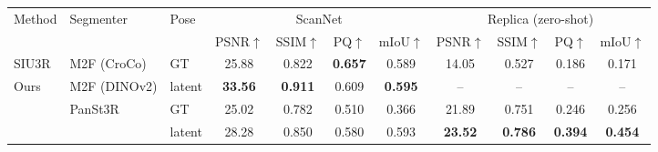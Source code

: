\documentclass[border=6pt]{standalone}
\begin{document}
\setlength{\tabcolsep}{5pt}
\small
\begin{tabular}{@{}lll cccc cccc@{}}
\toprule
\multirow{2}{*}{Method} & \multirow{2}{*}{Segmenter} & \multirow{2}{*}{Pose}
  & \multicolumn{4}{c}{ScanNet}
  & \multicolumn{4}{c}{Replica (zero-shot)} \\
\cmidrule(lr){4-7} \cmidrule(lr){8-11}
 & & & PSNR$\uparrow$ & SSIM$\uparrow$ & PQ$\uparrow$ & mIoU$\uparrow$
     & PSNR$\uparrow$ & SSIM$\uparrow$ & PQ$\uparrow$ & mIoU$\uparrow$ \\
\midrule
SIU3R & M2F (CroCo) & GT
  & 25.88 & 0.822 & \textbf{0.657} & 0.589
  & 14.05 & 0.527 & 0.186 & 0.171 \\
\midrule
\multirow{3}{*}{Ours} & M2F (DINOv2) & latent
  & \textbf{33.56} & \textbf{0.911} & 0.609 & \textbf{0.595}
  & -- & -- & -- & -- \\
\cmidrule(lr){2-11}
 & \multirow{2}{*}{PanSt3R} & GT
  & 25.02 & 0.782 & 0.510 & 0.366
  & 21.89 & 0.751 & 0.246 & 0.256 \\
 & & latent
  & 28.28 & 0.850 & 0.580 & 0.593
  & \textbf{23.52} & \textbf{0.786} & \textbf{0.394} & \textbf{0.454} \\
\bottomrule
\end{tabular}
\end{document}
